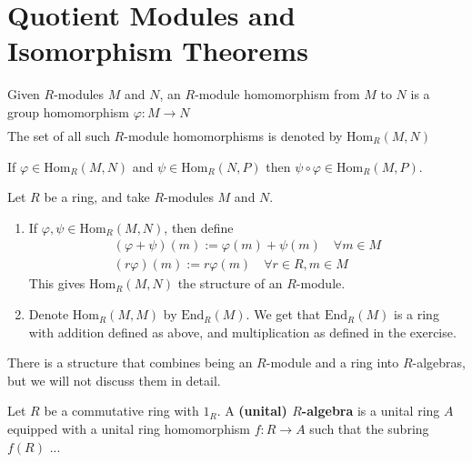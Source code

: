 \documentclass{memoir}
\begin{document}


\section{Quotient Modules and Isomorphism Theorems}
\label{sec:quotient_modules_and_isomorphism_theorems}

Given \(R\)-modules \(M\) and \(N\), an \(R\)-module homomorphism from \(M\) to \(N\) is a group homomorphism \(\varphi:M\to N\) 
\begin{align*}
	[\varphi(m +_M m') = \varphi(m) +_N \varphi(m') \quad \forall m,m' \in M]
\end{align*}
The set of all such \(R\)-module homomorphisms is denoted by \( \textrm{Hom}_R(M,N)\)

\begin{hw}
	If \(\varphi \in \textrm{Hom}_R(M,N)\) and \(\psi \in \textrm{Hom}_R(N,P)\) then \(\psi \circ \varphi \in \textrm{Hom}_R(M,P)\).
\end{hw}

\begin{prop}
	Let \(R\) be a ring, and take \(R\)-modules \(M\) and \(N\).
	\begin{enumerate}
		\item If \(\varphi,\psi \in \textrm{Hom}_R(M,N)\), then define
			\begin{align*}
				(\varphi+\psi)(m) := \varphi(m) + \psi(m) \quad \forall m \in M\\
				(r \varphi) (m) := r \varphi(m) \quad \forall r \in R, m \in M
			\end{align*}
			This gives \( \textrm{Hom}_R(M,N)\) the structure of an \(R\)-module.
		\item Denote \( \textrm{Hom}_R(M,M)\) by \( \textrm{End}_R(M)\). We get that \( \textrm{End}_R(M)\) is a ring with addition defined as above, and multiplication as defined in the exercise.
	\end{enumerate}
\end{prop}
There is a structure that combines being an \(R\)-module and a ring into \(R\)-algebras, but we will not discuss them in detail.

\begin{defn}
	Let \(R\) be a commutative ring with \(1_R\). A \textbf{(unital) \(R\)-algebra} is a unital ring \(A\) equipped with a unital ring homomorphism \(f:R\to A\) such that the subring \(f(R)\) ...
\end{defn}
\end{document}

